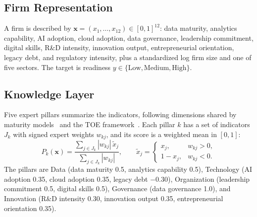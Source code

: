 \documentclass[10pt,journal,compsoc]{IEEEtran}
\begin{document}
\subsection{Firm Representation}

A firm is described by \(\mathbf{x}=(x_1,\ldots,x_{12})\in[0,1]^{12}\): data maturity, analytics capability, AI adoption, cloud adoption, data governance, leadership commitment, digital skills, R\&D intensity, innovation output, entrepreneurial orientation, legacy debt, and regulatory intensity, plus a standardized log firm size and one of five sectors. The target is readiness \(y\in\{\mathrm{Low},\mathrm{Medium},\mathrm{High}\}\).

\subsection{Knowledge Layer}

Five expert pillars summarize the indicators, following dimensions shared by maturity models~\cite{teichert2019,tubis2023,kljajic2021} and the TOE framework~\cite{tornatzky1990,omrani2024}. Each pillar \(k\) has a set of indicators \(J_k\) with signed expert weights \(w_{kj}\), and its score is a weighted mean in \([0,1]\):
\begin{equation}
P_k(\mathbf{x})
=
\frac{\sum_{j\in J_k}|w_{kj}|\,\tilde{x}_j}{\sum_{j\in J_k}|w_{kj}|},
\qquad
\tilde{x}_j
=
\begin{cases}
x_j, & w_{kj}>0,\\
1-x_j, & w_{kj}<0.
\end{cases}
\label{eq:pillar}
\end{equation}
The pillars are Data (data maturity 0.5, analytics capability 0.5), Technology (AI adoption 0.35, cloud adoption 0.35, legacy debt \(-0.30\)), Organization (leadership commitment 0.5, digital skills 0.5), Governance (data governance 1.0), and Innovation (R\&D intensity 0.30, innovation output 0.35, entrepreneurial orientation 0.35).
\end{document}
